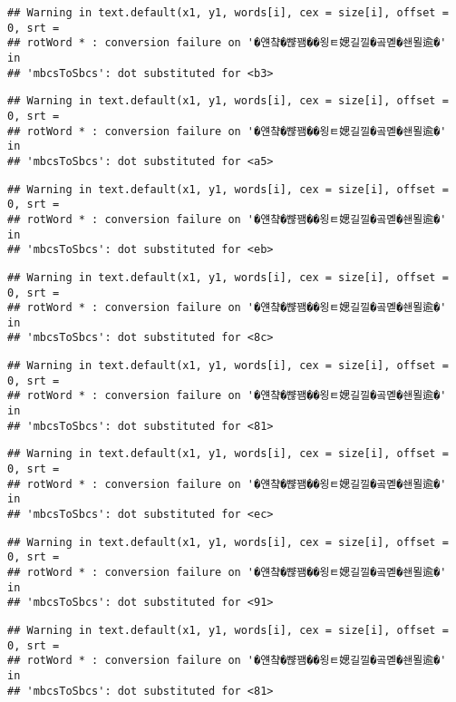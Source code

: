 \documentclass[]{article}
\begin{document}
\begin{verbatim}
## Warning in text.default(x1, y1, words[i], cex = size[i], offset = 0, srt =
## rotWord * : conversion failure on '�얜챸�뺞꽴��욍ㅌ媤길낄�곸몓�쇈묄逾�' in
## 'mbcsToSbcs': dot substituted for <b3>
\end{verbatim}

\begin{verbatim}
## Warning in text.default(x1, y1, words[i], cex = size[i], offset = 0, srt =
## rotWord * : conversion failure on '�얜챸�뺞꽴��욍ㅌ媤길낄�곸몓�쇈묄逾�' in
## 'mbcsToSbcs': dot substituted for <a5>
\end{verbatim}

\begin{verbatim}
## Warning in text.default(x1, y1, words[i], cex = size[i], offset = 0, srt =
## rotWord * : conversion failure on '�얜챸�뺞꽴��욍ㅌ媤길낄�곸몓�쇈묄逾�' in
## 'mbcsToSbcs': dot substituted for <eb>
\end{verbatim}

\begin{verbatim}
## Warning in text.default(x1, y1, words[i], cex = size[i], offset = 0, srt =
## rotWord * : conversion failure on '�얜챸�뺞꽴��욍ㅌ媤길낄�곸몓�쇈묄逾�' in
## 'mbcsToSbcs': dot substituted for <8c>
\end{verbatim}

\begin{verbatim}
## Warning in text.default(x1, y1, words[i], cex = size[i], offset = 0, srt =
## rotWord * : conversion failure on '�얜챸�뺞꽴��욍ㅌ媤길낄�곸몓�쇈묄逾�' in
## 'mbcsToSbcs': dot substituted for <81>
\end{verbatim}

\begin{verbatim}
## Warning in text.default(x1, y1, words[i], cex = size[i], offset = 0, srt =
## rotWord * : conversion failure on '�얜챸�뺞꽴��욍ㅌ媤길낄�곸몓�쇈묄逾�' in
## 'mbcsToSbcs': dot substituted for <ec>
\end{verbatim}

\begin{verbatim}
## Warning in text.default(x1, y1, words[i], cex = size[i], offset = 0, srt =
## rotWord * : conversion failure on '�얜챸�뺞꽴��욍ㅌ媤길낄�곸몓�쇈묄逾�' in
## 'mbcsToSbcs': dot substituted for <91>
\end{verbatim}

\begin{verbatim}
## Warning in text.default(x1, y1, words[i], cex = size[i], offset = 0, srt =
## rotWord * : conversion failure on '�얜챸�뺞꽴��욍ㅌ媤길낄�곸몓�쇈묄逾�' in
## 'mbcsToSbcs': dot substituted for <81>
\end{verbatim}
\end{document}

